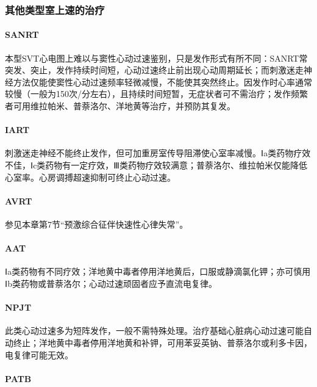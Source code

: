 \subsubsection{其他类型室上速的治疗}

\paragraph{SANRT}

本型SVT心电图上难以与窦性心动过速鉴别，只是发作形式有所不同：SANRT常突发、突止，发作持续时间短，心动过速终止前出现心动周期延长；而刺激迷走神经方法仅能使窦性心动过速频率轻微减慢，不能使其突然终止。因发作时心率通常较慢（一般为150次/分左右），且持续时间短暂，无症状者可不需治疗；发作频繁者可用维拉帕米、普萘洛尔、洋地黄等治疗，并预防其复发。

\paragraph{IART}

刺激迷走神经不能终止发作，但可加重房室传导阻滞使心室率减慢。Ⅰa类药物疗效不佳，Ⅰc类药物有一定疗效，Ⅲ类药物疗效较满意；普萘洛尔、维拉帕米仅能降低心室率。心房调搏超速抑制可终止心动过速。

\paragraph{AVRT}

参见本章第7节“预激综合征伴快速性心律失常”。

\paragraph{AAT}

Ⅰa类药物有不同疗效；洋地黄中毒者停用洋地黄后，口服或静滴氯化钾；亦可慎用Ⅰb类药物或普萘洛尔；心动过速顽固者应予直流电复律。

\paragraph{NPJT}

此类心动过速多为短阵发作，一般不需特殊处理。治疗基础心脏病心动过速可能自动终止；洋地黄中毒者停用洋地黄和补钾，可用苯妥英钠、普萘洛尔或利多卡因，电复律可能无效。

\paragraph{PATB}

